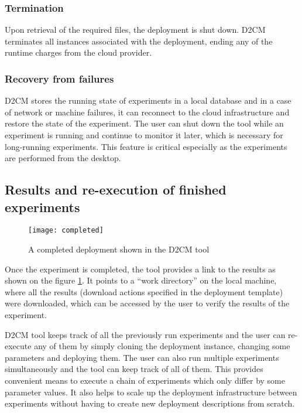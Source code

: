 \documentclass[a4paper,10pt]{article}
\begin{document}
\subsubsection{Termination}
Upon retrieval of the required files, the deployment is shut down. D2CM terminates all instances associated with the deployment, ending any of the runtime charges from the cloud provider. 

\subsubsection{Recovery from failures}


D2CM stores the running state of experiments in a local database and in a case of network or machine failures, it can reconnect to the cloud infrastructure and restore the state of the experiment. The user can shut down the tool while an experiment is running and continue to monitor it later, which is necessary for long-running experiments. This feature is critical especially as the experiments are performed from the desktop.    


\subsection{Results and re-execution of finished experiments}


\begin{figure}
\centering
\texttt{[image: completed]}
\caption{A completed deployment shown in the D2CM tool}
\label{fig:completed}
\end{figure}

Once the experiment is completed, the tool provides a link to the results as shown on the figure \ref{fig:completed}. It points to a "`work directory"' on the local machine, where all the results (download actions specified in the deployment template) were downloaded, which can be accessed by the user to verify the results of the experiment. 

D2CM tool keeps track of all the previously run experiments and the user can re-execute any of them by simply cloning the deployment instance, changing some parameters and deploying them. The user can also run multiple experiments simultaneously and the tool can keep track of all of them. This provides convenient means to execute a chain of experiments which only differ by some parameter values. It also helps to scale up the deployment infrastructure between experiments without having to create new deployment descriptions from scratch.   
\end{document}
